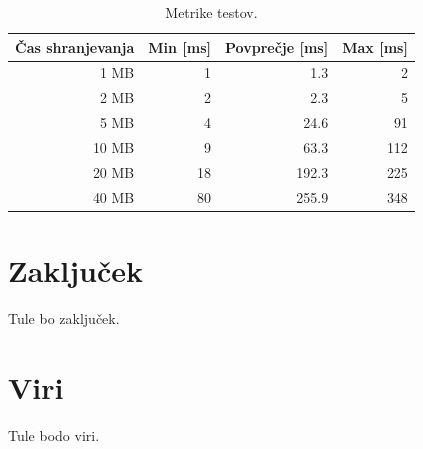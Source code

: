 \begin{table}[H]
	\centering
	\begin{tabular}{ | r | r | r | r | }
		\hline
		Čas shranjevanja & Min [ms] & Povprečje [ms] & Max [ms]  \\
		\hline
		1 MB & 1 & 1.3 & 2 \\
		2 MB & 2 & 2.3 & 5 \\
		5 MB & 4 & 24.6 & 91 \\
		10 MB & 9 & 63.3 & 112 \\
		20 MB & 18 & 192.3 & 225 \\
		40 MB & 80 & 255.9 & 348 \\
		\hline
	\end{tabular}
	\caption{Metrike  testov.}
	\label{table:1_chunks}
\end{table}












\section{Zaključek}
Tule bo zaključek.

\section{Viri}
Tule bodo viri.
